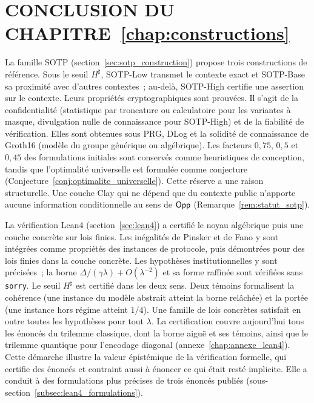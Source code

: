 
\section{CONCLUSION DU CHAPITRE~\ref{chap:constructions}}
\label{sec:conclusion_constructions}

\begin{sloppypar}
La famille SOTP (section~\ref{sec:sotp_construction}) propose trois
constructions de r\'ef\'erence. Sous le seuil $H^\sharp$, SOTP-Low transmet le contexte exact
et SOTP-Base sa proximit\'e avec d'autres contextes~; au-del\`a, SOTP-High certifie une
assertion sur le contexte. Leurs propri\'et\'es
cryptographiques sont prouv\'ees. Il s'agit de la confidentialit\'e (statistique par troncature ou
calculatoire pour les variantes \`a masque, divulgation nulle de connaissance pour SOTP-High) et de la
fiabilit\'e de v\'erification. Elles sont obtenues sous PRG, DLog et la solidit\'e de
connaissance de Groth16 (mod\`ele du groupe g\'en\'erique ou alg\'ebrique). Les facteurs
$0{,}75$, $0{,}5$ et $0{,}45$ des formulations initiales sont conserv\'es comme
heuristiques de conception, tandis que l'optimalit\'e universelle
est formul\'ee comme conjecture (Conjecture~\ref{conj:optimalite_universelle}). Cette
r\'eserve a une raison structurelle. Une couche Clay qui ne d\'epend que du contexte public
n'apporte aucune information conditionnelle au sens de $\mathsf{Opp}$
(Remarque~\ref{rem:statut_sotp}).

La v\'erification Lean4 (section~\ref{sec:lean4}) a certifi\'e
le noyau alg\'ebrique puis une couche concr\`ete sur lois finies. Les in\'egalit\'es de Pinsker et de Fano y sont
int\'egr\'ees comme propri\'et\'es des instances de protocole, puis d\'emontr\'ees pour
des lois finies dans la couche concr\`ete. Les hypoth\`eses
institutionnelles y sont pr\'ecis\'ees~; la borne
$\Delta/(\gamma\lambda) + O(\lambda^{-2})$ et sa forme raffin\'ee sont v\'erifi\'ees
sans \texttt{sorry}. Le seuil $H^\sharp$ est certifi\'e dans les deux sens. Deux t\'emoins
formalisent la coh\'erence (une instance du
mod\`ele abstrait atteint la borne rel\^ach\'ee) et la port\'ee (une instance hors
r\'egime atteint $1/4$). Une famille de lois concr\`etes satisfait en outre toutes les
hypoth\`eses pour tout $\lambda$. La certification couvre aujourd'hui tous les \'enonc\'es du
trilemme classique, dont la borne aigu\"e et ses t\'emoins, ainsi que le trilemme quantique pour
l'encodage diagonal (annexe~\ref{chap:annexe_lean4}). Cette d\'emarche illustre la valeur
\'epist\'emique de la v\'erification formelle, qui certifie des \'enonc\'es et contraint aussi
\`a \'enoncer ce qui \'etait rest\'e implicite. Elle a conduit \`a des formulations
plus pr\'ecises de trois \'enonc\'es publi\'es (sous-section~\ref{subsec:lean4_formulations}).


\end{sloppypar}
